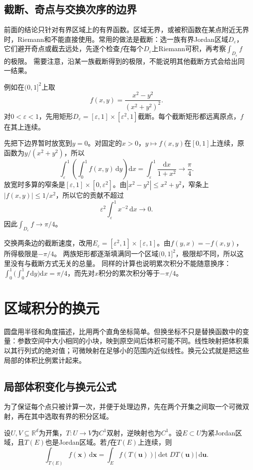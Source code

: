 \subsection{截断、奇点与交换次序的边界}

前面的结论只针对有界区域上的有界函数。区域无界，或被积函数在某点附近无界时，Riemann和不能直接使用。常用的做法是截断：选一族有界Jordan区域$D_\varepsilon$，它们避开奇点或截去远处，先逐个检查$f$在每个$D_\varepsilon$上Riemann可积，再考察$\int_{D_\varepsilon}f$的极限。
需要注意，沿某一族截断得到的极限，不能说明其他截断方式会给出同一结果。

例如在$(0,1]^2$上取
\[
 f(x,y)=\frac{x^2-y^2}{(x^2+y^2)^2}.
\]
对$0<\varepsilon<1$，先用矩形$D_\varepsilon=[\varepsilon,1]\times[\varepsilon^2,1]$截断。每个截断矩形都远离原点，$f$在其上连续。

先把下边界暂时放宽到$y=0$。对固定的$x>0$，$y\mapsto f(x,y)$在$[0,1]$上连续，原函数为$y/(x^2+y^2)$，所以
\[
 \int_\varepsilon^1\left(\int_0^1 f(x,y)\,\mathrm dy\right)\mathrm dx
 =\int_\varepsilon^1\frac{\mathrm dx}{1+x^2}
 \longrightarrow\frac\pi4.
\]
放宽时多算的窄条是$[\varepsilon,1]\times[0,\varepsilon^2]$。由$|x^2-y^2|\leq x^2+y^2$，窄条上$|f(x,y)|\leq1/x^2$，所以它的贡献不超过
\[
 \varepsilon^2\int_\varepsilon^1x^{-2}\,\mathrm dx\longrightarrow0.
\]
因此$\int_{D_\varepsilon}f\to\pi/4$。

交换两条边的截断速度，改用$E_\varepsilon=[\varepsilon^2,1]\times[\varepsilon,1]$。由$f(y,x)=-f(x,y)$，所得极限是$-\pi/4$。
两族矩形都逐渐填满同一个区域$(0,1]^2$，极限却不同，所以这里没有与截断方式无关的总量。
同样的计算也说明累次积分不能随意换序：$\int_0^1\bigl(\int_0^1f\,\mathrm dy\bigr)\mathrm dx=\pi/4$，而先对$x$积分的累次积分等于$-\pi/4$。

\section{区域积分的换元}
\label{sec:classical-change-variables}

圆盘用半径和角度描述，比用两个直角坐标简单。但换坐标不只是替换函数中的变量：参数空间中大小相同的小块，映到原空间后体积可能不同。线性映射把体积乘以其行列式的绝对值；可微映射在足够小的范围内近似线性。换元公式就是把这些局部的体积比例累计起来。

\subsection{局部体积变化与换元公式}

为了保证每个点只被计算一次，并便于处理边界，先在两个开集之间取一个可微双射，再在其中选取有界的积分区域。
\begin{theorem}[经典区域积分的换元]
设$U,V\subseteq\mathbb R^d$为开集，$T:U\to V$为$C^1$双射，逆映射也为$C^1$。设$E\subset U$为紧Jordan区域，且$T(E)$也是Jordan区域。若$f$在$T(E)$上连续，则
\[
 \int_{T(E)}f(\bm x)\,\mathrm d\bm x
 =\int_E f(T(\bm u))|\det DT(\bm u)|\,\mathrm d\bm u.
\]
\end{theorem}

